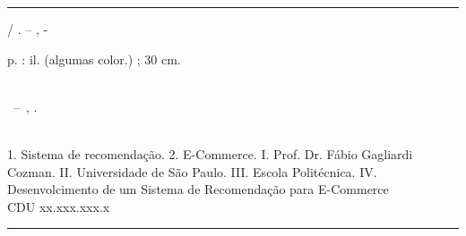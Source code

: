 \begin{fichacatalografica}\label{ficha catalografica}
	\vspace*{\fill}					%
	\hrule							%
	\begin{center}					%
	\begin{minipage}[c]{12.5cm}		%
	
	\imprimirautor
	
	\hspace{0.5cm} \imprimirtitulo  / \imprimirautor. --
	\imprimirlocal, \imprimirdata-
	
	\hspace{0.5cm} \pageref{LastPage} p. : il. (algumas color.) ; 30 cm.\\
	
	\hspace{0.5cm} \imprimirorientadorRotulo~\imprimirorientador\\
	
	\hspace{0.5cm}
	\parbox[t]{\textwidth}{\imprimirtipotrabalho~--~\imprimirinstituicao,
	\imprimirdata.}\\
	
	\hspace{0.5cm}
		1. Sistema de recomendação.
		2. E-Commerce.
		I. Prof. Dr. Fábio Gagliardi Cozman.
		II. Universidade de São Paulo.
		III. Escola Politécnica.
		IV. Desenvolcimento de um Sistema de Recomendação para E-Commerce\\ 			
	
	\hspace{8.75cm} CDU xx.xxx.xxx.x\\
	
	\end{minipage}
	\end{center}
	\hrule
\end{fichacatalografica}